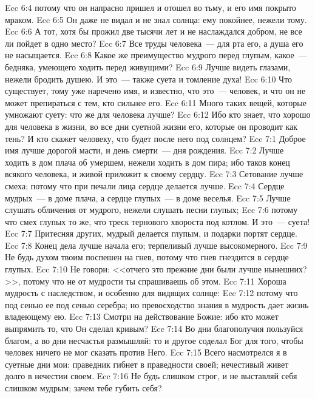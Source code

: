 \vs Ecc 6:4 потому что он напрасно пришел и отошел во тьму, и его имя покрыто мраком.
\vs Ecc 6:5 Он даже не видал и не знал солнца: ему покойнее, нежели тому.
\vs Ecc 6:6 А тот, хотя бы прожил две тысячи лет и не наслаждался добром, не все ли пойдет в одно место?
\vs Ecc 6:7 Все труды человека~--- для рта его, а душа его не насыщается.
\vs Ecc 6:8 Какое же преимущество мудрого перед глупым, какое~--- бедняка, умеющего ходить перед живущими?
\vs Ecc 6:9 Лучше видеть глазами, нежели бродить душею. И это~--- также суета и томление духа!
\vs Ecc 6:10 Что существует, тому уже наречено имя, и известно, что это~--- человек, и что он не может препираться с тем, кто сильнее его.
\vs Ecc 6:11 Много таких вещей, которые умножают суету: что же для человека лучше?
\vs Ecc 6:12 Ибо кто знает, что хорошо для человека в жизни, во все дни суетной жизни его, которые он проводит как тень? И кто скажет человеку, что будет после него под солнцем?
\vs Ecc 7:1 Доброе имя лучше дорогой масти, и день смерти~--- дня рождения.
\vs Ecc 7:2 Лучше ходить в дом плача об умершем, нежели ходить в дом пира; ибо таков конец всякого человека, и живой приложит  к своему сердцу.
\vs Ecc 7:3 Сетование лучше смеха; потому что при печали лица сердце делается лучше.
\vs Ecc 7:4 Сердце мудрых~--- в доме плача, а сердце глупых~--- в доме веселья.
\vs Ecc 7:5 Лучше слушать обличения от мудрого, нежели слушать песни глупых;
\vs Ecc 7:6 потому что смех глупых то же, что треск тернового хвороста под котлом. И это~--- суета!
\rsbpar\vs Ecc 7:7 Притесняя других, мудрый делается глупым, и подарки портят сердце.
\vs Ecc 7:8 Конец дела лучше начала его; терпеливый лучше высокомерного.
\vs Ecc 7:9 Не будь духом твоим поспешен на гнев, потому что гнев гнездится в сердце глупых.
\vs Ecc 7:10 Не говори: <<отчего это прежние дни были лучше нынешних?>>, потому что не от мудрости ты спрашиваешь об этом.
\vs Ecc 7:11 Хороша мудрость с наследством, и особенно для видящих солнце:
\vs Ecc 7:12 потому что под сенью ее  под сенью серебра; но превосходство знания в  мудрость дает жизнь владеющему ею.
\vs Ecc 7:13 Смотри на действование Божие: ибо кто может выпрямить то, что Он сделал кривым?
\vs Ecc 7:14 Во дни благополучия пользуйся благом, а во дни несчастья размышляй: то и другое соделал Бог для того, чтобы человек ничего не мог сказать против Него.
\rsbpar\vs Ecc 7:15 Всего насмотрелся я в суетные дни мои: праведник гибнет в праведности своей; нечестивый живет долго в нечестии своем.
\vs Ecc 7:16 Не будь слишком строг, и не выставляй себя слишком мудрым; зачем тебе губить себя?
